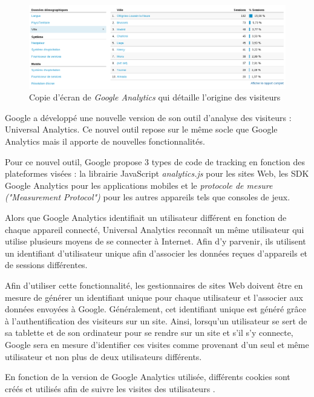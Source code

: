 \begin{figure}[!h]
	\centering
	\includegraphics[scale=0.35]{examples/Google_Analytics_2.png}
	\caption{\label{Google_Analytics_2}Copie d'écran de \textit{Google Analytics} qui détaille l'origine des visiteurs}
\end{figure}

Google a développé une nouvelle version de son outil d'analyse des visiteurs : Universal Analytics. Ce nouvel outil repose sur le même socle que Google Analytics mais il apporte de nouvelles fonctionnalités.

Pour ce nouvel outil, Google propose 3 types de code de tracking en fonction des plateformes visées : la librairie JavaScript \textit{analytics.js} pour les sites Web, les SDK Google Analytics pour les applications mobiles et le \textit{protocole de mesure ("Measurement Protocol")} pour les autres appareils tels que consoles de jeux.%
\newline

Alors que Google Analytics identifiait un utilisateur différent en fonction de chaque appareil connecté, Universal Analytics reconnaît un même utilisateur qui utilise plusieurs moyens de se connecter à Internet. Afin d'y parvenir, ils utilisent un identifiant d'utilisateur unique afin d'associer les données reçues d'appareils et de sessions différentes.

Afin d'utiliser cette fonctionnalité, les gestionnaires de sites Web doivent être en mesure de générer un identifiant unique pour chaque utilisateur et l'associer aux données envoyées à Google. Généralement, cet identifiant unique est généré grâce à l'authentification des visiteurs sur un site. Ainsi, lorsqu'un utilisateur se sert de sa tablette et de son ordinateur pour se rendre sur un site et s'il s'y connecte, Google sera en mesure d'identifier ces visites comme provenant d'un seul et même utilisateur et non plus de deux utilisateurs différents.
\newline

En fonction de la version de Google Analytics utilisée, différents cookies sont créés et utilisés afin de suivre les visites des utilisateurs \cite{Google_Analytics_cookies}.
\newline

